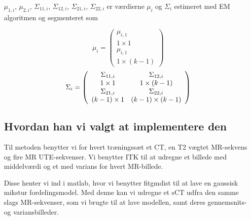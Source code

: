 $\mu_{1,i}$, $\mu_{2,i}$, $\Sigma_{1 1, i}$, $\Sigma_{1 2, i}$, $\Sigma_{2 1, i}$, $\Sigma_{2 2, i}$ er værdierne $\mu_i$ og $\Sigma_i$ estimeret med EM algoritmen og segmenteret som

\begin{equation}
\mu_i = \left(\begin{array}{c}
\mu_{i,1} \\ 1 \times 1 \\
\mu_{i,1} \\ 1 \times (k - 1)  
\end{array}\right)
\end{equation} 
\begin{equation}
\Sigma_i = \left(\begin{array}{c c}
\Sigma_{11,i} & \Sigma_{12,i} \\ 1 \times 1  & 1 \times (k-1)\\
\Sigma_{21,i} & \Sigma_{22,i} \\ (k-1) \times 1  & (k-1) \times (k-1)\\  
\end{array}\right)
\end{equation}

\subsection{Hvordan han vi valgt at implementere den}

Til metoden benytter vi for hvert træningssæt et CT, en T2 vægtet MR-sekvens
og fire MR UTE-sekvenser. Vi benytter ITK til at udregne et
billede med middelværdi og et med varians for hvert MR-billede.

Disse henter vi ind i matlab, hvor vi benytter fitgmdist til at lave en
gaussisk mikstur fordelingsmodel. Med denne kan vi udregne et sCT udfra den
samme slags MR-sekvenser, som vi brugte til at lave modellen, samt deres
gennemsnits- og variansbilleder.

